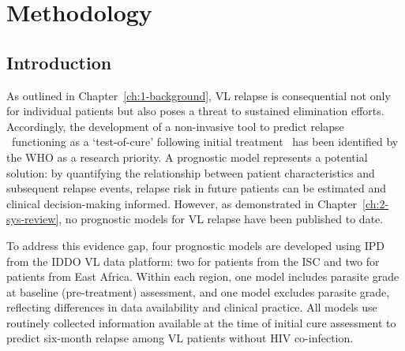 
\chapter{\label{ch:3-isc-model-methodology}Methodology}
\minitoc

\section*{Introduction}

As outlined in Chapter~\ref{ch:1-background}, VL relapse is consequential not only for individual patients but also poses a threat to sustained elimination efforts. Accordingly, the development of a non-invasive tool to predict relapse \textemdash\ functioning as a `test-of-cure' following initial treatment \textemdash\ has been identified by the WHO as a research priority\cite{WHO2024_Leishmaniasis,WHO_2024_VL_easternAfrica,who_sea_elim}. A prognostic model represents a potential solution: by quantifying the relationship between patient characteristics and subsequent relapse events, relapse risk in future patients can be estimated and clinical decision-making informed. However, as demonstrated in Chapter~\ref{ch:2-sys-review}, no prognostic models for VL relapse have been published to date.

To address this evidence gap, four prognostic models are developed using IPD from the IDDO VL data platform: two for patients from the ISC and two for patients from East Africa. Within each region, one model includes parasite grade at baseline (pre-treatment) assessment, and one model excludes parasite grade, reflecting differences in data availability and clinical practice. All models use routinely collected information available at the time of initial cure assessment to predict six-month relapse among VL patients without HIV co-infection.

